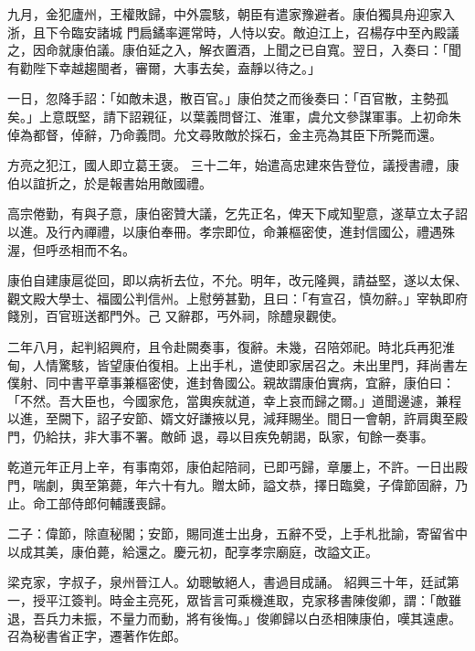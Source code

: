 \begin{pinyinscope}
 九月，金犯廬州，王權敗歸，中外震駭，朝臣有遣家豫避者。康伯獨具舟迎家入浙，且下令臨安諸城
 門扃鐍率遲常時，人恃以安。敵迫江上，召楊存中至內殿議之，因命就康伯議。康伯延之入，解衣置酒，上聞之已自寬。翌日，入奏曰：「聞有勸陛下幸越趨閩者，審爾，大事去矣，盍靜以待之。」



 一日，忽降手詔：「如敵未退，散百官。」康伯焚之而後奏曰：「百官散，主勢孤矣。」上意既堅，請下詔親征，以葉義問督江、淮軍，虞允文參謀軍事。上初命朱倬為都督，倬辭，乃命義問。允文尋敗敵於採石，金主亮為其臣下所斃而還。



 方亮之犯江，國人即立葛王褒。
 三十二年，始遣高忠建來告登位，議授書禮，康伯以誼折之，於是報書始用敵國禮。



 高宗倦勤，有與子意，康伯密贊大議，乞先正名，俾天下咸知聖意，遂草立太子詔以進。及行內禪禮，以康伯奉冊。孝宗即位，命兼樞密使，進封信國公，禮遇殊渥，但呼丞相而不名。



 康伯自建康扈從回，即以病祈去位，不允。明年，改元隆興，請益堅，遂以太保、觀文殿大學士、福國公判信州。上慰勞甚勤，且曰：「有宣召，慎勿辭。」宰執即府餞別，百官班送都門外。己
 又辭郡，丐外祠，除醴泉觀使。



 二年八月，起判紹興府，且令赴闕奏事，復辭。未幾，召陪郊祀。時北兵再犯淮甸，人情驚駭，皆望康伯復相。上出手札，遣使即家居召之。未出里門，拜尚書左僕射、同中書平章事兼樞密使，進封魯國公。親故謂康伯實病，宜辭，康伯曰：「不然。吾大臣也，今國家危，當輿疾就道，幸上哀而歸之爾。」道聞邊遽，兼程以進，至闕下，詔子安節、婿文好謙掖以見，減拜賜坐。間日一會朝，許肩輿至殿門，仍給扶，非大事不署。敵師
 退，尋以目疾免朝謁，臥家，旬餘一奏事。



 乾道元年正月上辛，有事南郊，康伯起陪祠，已即丐歸，章屢上，不許。一日出殿門，喘劇，輿至第薨，年六十有九。贈太師，謚文恭，擇日臨奠，子偉節固辭，乃止。命工部侍郎何輔護喪歸。



 二子：偉節，除直秘閣；安節，賜同進士出身，五辭不受，上手札批諭，寄留省中以成其美，康伯薨，給還之。慶元初，配享孝宗廟庭，改謚文正。



 梁克家，字叔子，泉州晉江人。幼聰敏絕人，書過目成誦。
 紹興三十年，廷試第一，授平江簽判。時金主亮死，眾皆言可乘機進取，克家移書陳俊卿，謂：「敵雖退，吾兵力未振，不量力而動，將有後悔。」俊卿歸以白丞相陳康伯，嘆其遠慮。召為秘書省正字，遷著作佐郎。




\end{pinyinscope}
